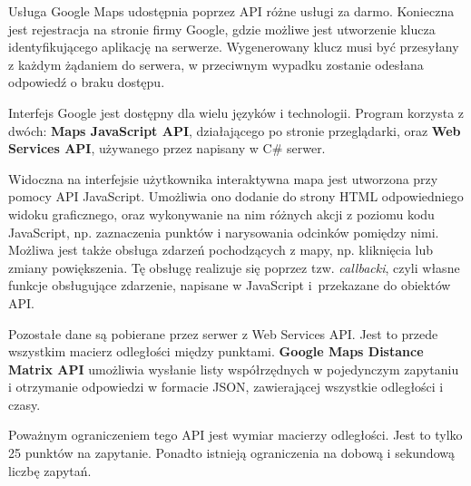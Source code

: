 Usługa Google Maps udostępnia poprzez API różne usługi za darmo. Konieczna jest rejestracja na stronie firmy Google, gdzie możliwe jest utworzenie klucza identyfikującego aplikację na serwerze. Wygenerowany klucz musi być przesyłany z każdym żądaniem do serwera, w przeciwnym wypadku zostanie odesłana odpowiedź o braku dostępu.

Interfejs Google jest dostępny dla wielu języków i technologii. Program korzysta z dwóch: \textbf{Maps JavaScript API}, działającego po stronie przeglądarki, oraz \textbf{Web Services API}, używanego przez napisany w C\# serwer.

Widoczna na interfejsie użytkownika interaktywna mapa jest utworzona przy pomocy API JavaScript. Umożliwia ono dodanie do strony HTML odpowiedniego widoku graficznego, oraz wykonywanie na nim różnych akcji z poziomu kodu JavaScript, np. zaznaczenia punktów i narysowania odcinków pomiędzy nimi. Możliwa jest także obsługa zdarzeń pochodzących z mapy, np. kliknięcia lub zmiany powiększenia. Tę obsługę realizuje się poprzez tzw. \textit{callbacki}, czyli własne funkcje obsługujące zdarzenie, napisane w JavaScript i~przekazane do obiektów API.

Pozostałe dane są pobierane przez serwer z Web Services API. Jest to przede wszystkim macierz odległości między punktami. \textbf{Google Maps Distance Matrix API} umożliwia wysłanie listy współrzędnych w pojedynczym zapytaniu i otrzymanie odpowiedzi w formacie JSON, zawierającej wszystkie odległości i czasy.

Poważnym ograniczeniem tego API jest wymiar macierzy odległości. Jest to tylko 25 punktów na zapytanie. Ponadto istnieją ograniczenia na dobową i sekundową liczbę zapytań.